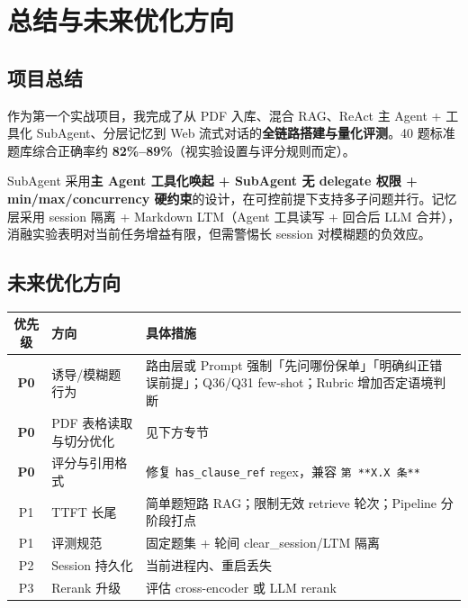 \documentclass[11pt,a4paper]{ctexart}
\begin{document}
\section{总结与未来优化方向}

\subsection{项目总结}

作为第一个实战项目，我完成了从 PDF 入库、混合 RAG、ReAct 主 Agent + 工具化 SubAgent、分层记忆到 Web 流式对话的\textbf{全链路搭建与量化评测}。40 题标准题库综合正确率约 \textbf{82\%--89\%}（视实验设置与评分规则而定）。

SubAgent 采用\textbf{主 Agent 工具化唤起 + SubAgent 无 delegate 权限 + min/max/concurrency 硬约束}的设计，在可控前提下支持多子问题并行。记忆层采用 session 隔离 + Markdown LTM（Agent 工具读写 + 回合后 LLM 合并），消融实验表明对当前任务增益有限，但需警惕长 session 对模糊题的负效应。

\subsection{未来优化方向}

\begin{center}
\begin{tabular}{clp{7.5cm}}
\toprule
\textbf{优先级} & \textbf{方向} & \textbf{具体措施} \\
\midrule
\textbf{P0} & 诱导/模糊题行为 & 路由层或 Prompt 强制「先问哪份保单」「明确纠正错误前提」；Q36/Q31 few-shot；Rubric 增加否定语境判断 \\
\textbf{P0} & PDF 表格读取与切分优化 & 见下方专节 \\
\textbf{P0} & 评分与引用格式 & 修复 \texttt{has\_clause\_ref} regex，兼容 \texttt{第 **X.X 条**} \\
P1 & TTFT 长尾 & 简单题短路 RAG；限制无效 retrieve 轮次；Pipeline 分阶段打点 \\
P1 & 评测规范 & 固定题集 + 轮间 clear\_session/LTM 隔离 \\
P2 & Session 持久化 & 当前进程内、重启丢失 \\
P3 & Rerank 升级 & 评估 cross-encoder 或 LLM rerank \\
\bottomrule
\end{tabular}
\end{center}
\end{document}
